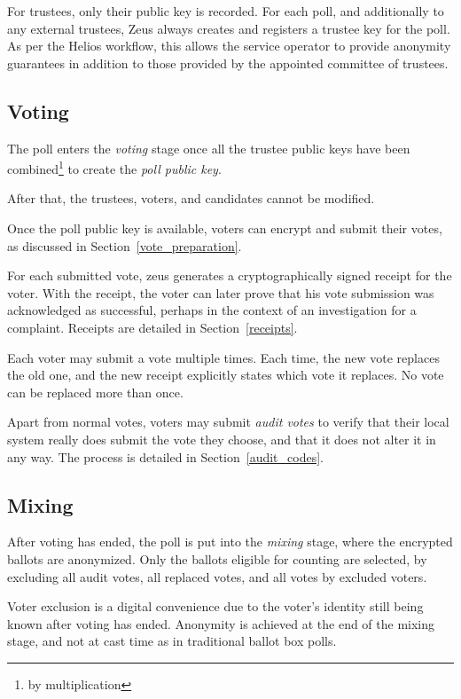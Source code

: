 \documentclass[letterpaper,10pt]{article}
\begin{document}
For trustees, only their public key is recorded.
For each poll, and additionally to any external trustees,
Zeus always creates and registers a trustee key for the poll.
As per the Helios workflow, this allows the service operator to
provide anonymity guarantees in addition to those provided by
the appointed committee of trustees.

\subsection{Voting}
\label{voting}
The poll enters the \emph{voting} stage once all the trustee public
keys have been combined\footnote{by multiplication} to create the
\emph{poll public key}.

After that, the trustees, voters, and candidates cannot be modified.

Once the poll public key is available,
voters can encrypt and submit their votes,
as discussed in Section~\ref{vote_preparation}.

For each submitted vote, zeus generates a cryptographically signed
receipt for the voter.
With the receipt, the voter can later prove that his vote submission was
acknowledged as successful, perhaps in the context of an investigation
for a complaint.
Receipts are detailed in Section~\ref{receipts}.

Each voter may submit a vote multiple times.
Each time, the new vote replaces the old one,
and the new receipt explicitly states which vote it replaces.
No vote can be replaced more than once.

Apart from normal votes, voters may submit \emph{audit votes} to verify
that their local system really does submit the vote they choose,
and that it does not alter it in any way.
The process is detailed in Section~\ref{audit_codes}.

\subsection{Mixing}
\label{mixing}
After voting has ended, the poll is put into the \emph{mixing} stage,
where the encrypted ballots are anonymized.
Only the ballots eligible for counting are selected, by excluding
all audit votes, all replaced votes, and all votes by excluded voters.

Voter exclusion is a digital convenience due to
the voter's identity still being known after voting has ended.
Anonymity is achieved at the end of the mixing stage,
and not at cast time as in traditional ballot box polls.
\end{document}
